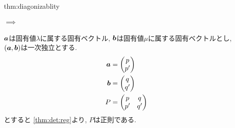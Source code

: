 \begin{proofof}{thm:diagonizablity}
  \paragraph{$\implies$}
  $\boldsymbol{a}$は固有値$\lambda$に属する固有ベクトル,
  $\boldsymbol{b}$は固有値$\mu$に属する固有ベクトルとし,
  $(\boldsymbol{a},\boldsymbol{b})$は一次独立とする.
  \begin{align*}
    \boldsymbol{a}&=
    \begin{pmatrix}
      p\\p'
    \end{pmatrix}\\
    \boldsymbol{b}&=
    \begin{pmatrix}
      q\\q'
    \end{pmatrix}\\
    P&=
    \begin{pmatrix}
      p&q\\p'&q'
    \end{pmatrix}
  \end{align*}
  とすると
  \cref{thm:det:reg}より,
  $P$は正則である.


\end{proofof}
